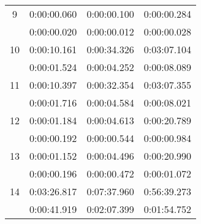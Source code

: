 \documentclass[a4paper,11pt]{report}
\begin{document}
{\begin{center}
\begin{tabular}{c|c|c|c}
\hline
9&
0:00:00.060&
0:00:00.100&
0:00:00.284\\
&
0:00:00.020&
0:00:00.012&
0:00:00.028\\
\hline
10&
0:00:10.161&
0:00:34.326&
0:03:07.104\\
&
0:00:01.524&
0:00:04.252&
0:00:08.089\\
\hline
11&
0:00:10.397&
0:00:32.354&
0:03:07.355\\
&
0:00:01.716&
0:00:04.584&
0:00:08.021\\
\hline
12&
0:00:01.184&
0:00:04.613&
0:00:20.789\\
&
0:00:00.192&
0:00:00.544&
0:00:00.984\\
\hline
13&
0:00:01.152&
0:00:04.496&
0:00:20.990\\
&
0:00:00.196&
0:00:00.472&
0:00:01.072\\
\hline
14&
0:03:26.817&
0:07:37.960&
0:56:39.273\\
&
0:00:41.919&
0:02:07.399&
0:01:54.752\\
\end{tabular}\\[2mm]
\end{center}

 }
\end{document}
